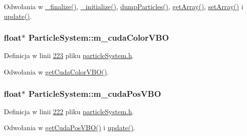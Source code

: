 Odwołania w \hyperlink{particle_system_8cpp_source_l00233}{\-\_\-finalize()}, \hyperlink{particle_system_8cpp_source_l00142}{\-\_\-initialize()}, \hyperlink{particle_system_8cpp_source_l00360}{dump\-Particles()}, \hyperlink{particle_system_8cpp_source_l00375}{get\-Array()}, \hyperlink{particle_system_8cpp_source_l00403}{set\-Array()} i \hyperlink{particle_system_8cpp_source_l00266}{update()}.

\hypertarget{class_particle_system_a39d210b57da5f7f4a2c23f4fc0b43ea1}{
\subsubsection[{m\-\_\-cuda\-Color\-V\-B\-O}]{\setlength{\rightskip}{0pt plus 5cm}float$\ast$ Particle\-System\-::m\-\_\-cuda\-Color\-V\-B\-O\hspace{0.3cm}{\ttfamily [protected]}}}\label{class_particle_system_a39d210b57da5f7f4a2c23f4fc0b43ea1}


Definicja w linii \hyperlink{particle_system_8h_source_l00223}{223} pliku \hyperlink{particle_system_8h_source}{particle\-System.\-h}.



Odwołania w \hyperlink{particle_system_8h_source_l00070}{get\-Cuda\-Color\-V\-B\-O()}.

\hypertarget{class_particle_system_aba18245745f621d90186862f1a559d9e}{
\subsubsection[{m\-\_\-cuda\-Pos\-V\-B\-O}]{\setlength{\rightskip}{0pt plus 5cm}float$\ast$ Particle\-System\-::m\-\_\-cuda\-Pos\-V\-B\-O\hspace{0.3cm}{\ttfamily [protected]}}}\label{class_particle_system_aba18245745f621d90186862f1a559d9e}


Definicja w linii \hyperlink{particle_system_8h_source_l00222}{222} pliku \hyperlink{particle_system_8h_source}{particle\-System.\-h}.



Odwołania w \hyperlink{particle_system_8h_source_l00066}{get\-Cuda\-Pos\-V\-B\-O()} i \hyperlink{particle_system_8cpp_source_l00266}{update()}.

